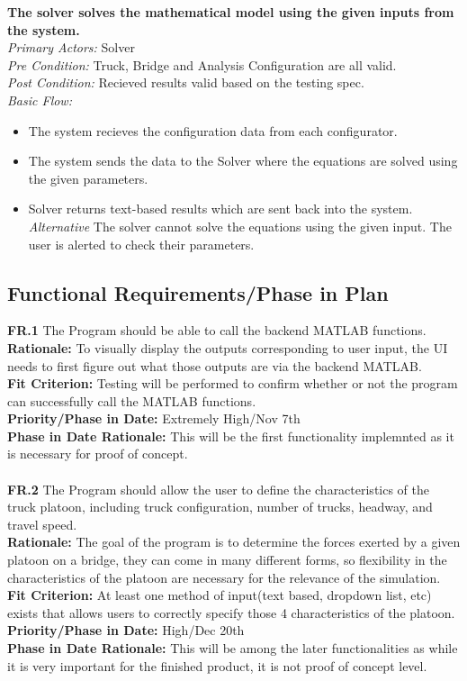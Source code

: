 \documentclass[12pt]{article}
\begin{document}
\noindent
\textbf{The solver solves the mathematical model using the given inputs from the system.} \\
\emph{  Primary Actors:} Solver\\
\emph{  Pre Condition:} Truck, Bridge and Analysis Configuration are all valid.\\
\emph{  Post Condition:} Recieved results valid based on the testing spec.\\ 
\emph{  Basic Flow:} 
\begin{itemize}
\item The system recieves the configuration data from each configurator. 
\item The system sends the data to the Solver where the equations are solved using the given parameters. 
\item Solver returns text-based results which are sent back into the system. 
\subitem \emph{Alternative} The solver cannot solve the equations using the given input. The user is alerted to check their parameters. 
\end{itemize}




\subsection{Functional Requirements/Phase in Plan}
  \textbf{FR.1} The Program should be able to call the backend MATLAB functions. \\
  \textbf{Rationale:} To visually display the outputs corresponding to user input, the UI needs to first figure out what those outputs are via the backend MATLAB.\\
  \textbf{Fit Criterion:} Testing will be performed to confirm whether or not the program can successfully call the MATLAB functions.\\
  \textbf{Priority/Phase in Date:} Extremely High/Nov 7th\\
  \textbf{Phase in Date Rationale:} This will be the first functionality implemnted as it is necessary for proof of concept.\\\\
  
  \noindent\textbf{FR.2} The Program should allow the user to define the characteristics of the truck platoon, including truck configuration, number of trucks, headway, and travel speed.\\
  \textbf{Rationale:} The goal of the program is to determine the forces exerted by a given platoon on a bridge, they can come in many different forms, so flexibility in the characteristics
  of the platoon are necessary for the relevance of the simulation.\\ 
  \textbf{Fit Criterion:} At least one method of input(text based, dropdown list, etc) exists that allows users to correctly specify those 4 characteristics of the platoon.\\
  \textbf{Priority/Phase in Date:} High/Dec 20th\\
  \textbf{Phase in Date Rationale:} This will be among the later functionalities as while it is very important for the finished product, it is not proof of concept level.\\\\
\end{document}
